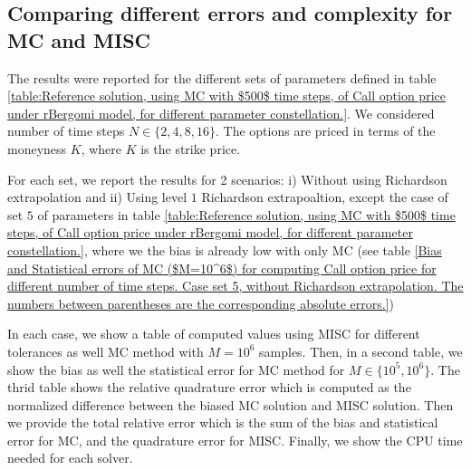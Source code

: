 \documentclass[11pt]{article}
\begin{document}
\subsection{Comparing different  errors and complexity for MC and MISC}\label{sec:Comparing different  errors and complexity for MC and MISC}


The results were reported for the different sets of parameters defined in table \ref{table:Reference solution, using MC with $500$ time steps, of Call option price under rBergomi model, for different parameter constellation.}. We considered   number of time steps $N \in \{2,4,8,16\}$.  The options are priced in terms of the moneyness $K$, where $K$ is the strike price.   

 For each set,  we report the results for 2 scenarios: i) Without using Richardson extrapolation and  ii) Using level $1$ Richardson extrapoaltion, except the case of set $5$ of parameters in table \ref{table:Reference solution, using MC with $500$ time steps, of Call option price under rBergomi model, for different parameter constellation.}, where we the bias is already low with only MC (see table \ref{Bias and Statistical errors of MC ($M=10^6$)  for computing Call option price  for different number of time steps. Case set 5, without Richardson extrapolation. The numbers between parentheses are the corresponding absolute errors.})

In each case, we show a table of computed values using MISC for different tolerances as well MC method with $M =10^6$ samples. Then, in a second table,  we show the bias as well the statistical error for MC method for $M \in \{10^5, 10^6\}$. The thrid table shows the relative quadrature error which is computed as the normalized difference between the biased MC solution and MISC solution. Then we provide the total relative error which is the sum of the bias and statistical error for MC, and the quadrature error for MISC. Finally, we show the CPU time needed for each solver. 












\end{document}

